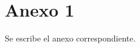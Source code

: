 \rhead{\newtitle}
\cfoot{\thepage}
\renewcommand{\headrulewidth}{1pt}
\renewcommand{\footrulewidth}{1pt}
\chapter*{Anexo 1}
\noindent Se escribe el anexo correspondiente.